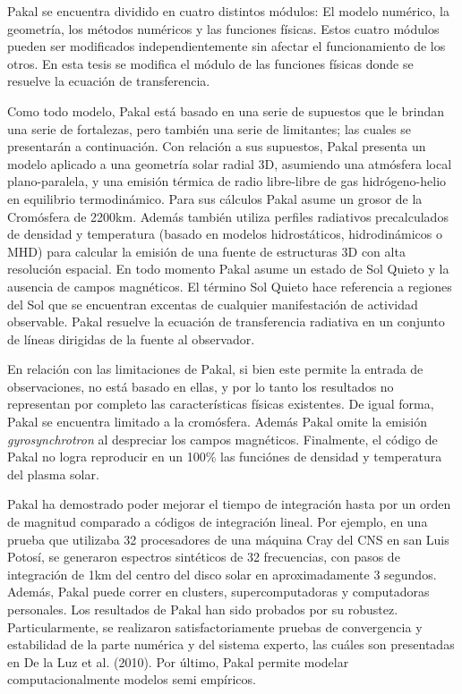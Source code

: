 Pakal se encuentra dividido en cuatro distintos m\'odulos: El modelo num\'erico, la geometr\'ia, los m\'etodos num\'ericos y las funciones f\'isicas. Estos cuatro m\'odulos pueden ser modificados independientemente sin afectar el funcionamiento de los otros. En esta tesis se modifica el m\'odulo de las funciones f\'isicas donde se resuelve la ecuaci\'on de transferencia.

Como todo modelo, Pakal est\'a basado en una serie de supuestos que le brindan una serie de fortalezas, pero tambi\'en una serie de limitantes; las cuales se presentar\'an a continuaci\'on. Con relaci\'on a sus supuestos, Pakal presenta un modelo aplicado a una geometr\'ia solar radial 3D, asumiendo una atm\'osfera local plano-paralela, y una emisi\'on t\'ermica de radio libre-libre de gas hidr\'ogeno-helio en equilibrio termodin\'amico. Para sus c\'alculos Pakal asume un grosor de la Crom\'osfera de 2200km. Adem\'as tambi\'en utiliza perfiles radiativos precalculados de densidad y temperatura (basado en modelos hidrost\'aticos, hidrodin\'amicos o MHD) para calcular la emisi\'on de una fuente de estructuras 3D con alta resoluci\'on espacial. En todo momento Pakal asume un estado de Sol Quieto y la ausencia de campos magn\'eticos. El t\'ermino Sol Quieto hace referencia a regiones del Sol que se encuentran excentas de cualquier manifestaci\'on de actividad observable. Pakal resuelve la ecuaci\'on de transferencia radiativa en un conjunto de l\'ineas dirigidas de la fuente al observador.

En relaci\'on con las limitaciones de Pakal, si bien este permite la entrada de observaciones, no est\'a basado en ellas, y por lo tanto los resultados no representan por completo las caracter\'isticas f\'isicas existentes. De igual forma, Pakal se encuentra limitado a la crom\'osfera. Adem\'as Pakal omite la emisi\'on \emph{gyrosynchrotron} al despreciar los campos magn\'eticos. Finalmente, el c\'odigo de Pakal no logra reproducir en un 100\% las funci\'ones de densidad y temperatura del plasma solar.
 
Pakal ha demostrado poder mejorar el tiempo de integraci\'on hasta por un orden de magnitud comparado a c\'odigos de integraci\'on lineal. Por ejemplo, en una prueba que utilizaba 32 procesadores de una m\'aquina Cray del CNS en san Luis Potos\'i, se generaron espectros sint\'eticos de 32 frecuencias, con pasos de integraci\'on de 1km del centro del disco solar en aproximadamente 3 segundos. Adem\'as, Pakal puede correr en clusters, supercomputadoras y computadoras personales. Los resultados de Pakal han sido probados por su robustez. Particularmente, se realizaron satisfactoriamente pruebas de convergencia y estabilidad de la parte num\'erica y del sistema experto, las cu\'ales son presentadas en De la Luz et al. (2010). Por \'ultimo, Pakal permite modelar computacionalmente modelos semi emp\'iricos. 


